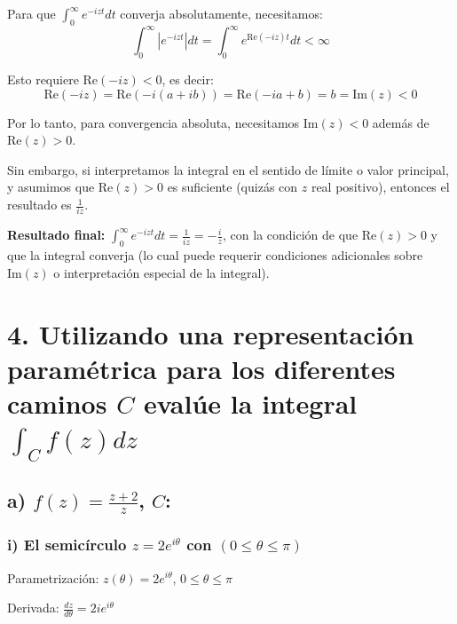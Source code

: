 \documentclass{article}
\begin{document}
Para que $\int_0^{\infty} e^{-izt} dt$ converja absolutamente, necesitamos:
$$\int_0^{\infty} |e^{-izt}| dt = \int_0^{\infty} e^{\text{Re}(-iz)t} dt < \infty$$

Esto requiere $\text{Re}(-iz) < 0$, es decir:
$$\text{Re}(-iz) = \text{Re}(-i(a + ib)) = \text{Re}(-ia + b) = b = \text{Im}(z) < 0$$

Por lo tanto, para convergencia absoluta, necesitamos $\text{Im}(z) < 0$ además de $\text{Re}(z) > 0$.

Sin embargo, si interpretamos la integral en el sentido de límite o valor principal, y asumimos que $\text{Re}(z) > 0$ es suficiente (quizás con $z$ real positivo), entonces el resultado es $\frac{1}{iz}$.

\textbf{Resultado final:} $\int_0^{\infty} e^{-izt} dt = \frac{1}{iz} = -\frac{i}{z}$, con la condición de que $\text{Re}(z) > 0$ y que la integral converja (lo cual puede requerir condiciones adicionales sobre $\text{Im}(z)$ o interpretación especial de la integral).

\newpage
\section*{4. Utilizando una representación paramétrica para los diferentes caminos $C$ evalúe la integral $\int_C f(z) dz$}

\subsection*{a) $f(z) = \frac{z + 2}{z}$, $C$:}

\subsubsection*{i) El semicírculo $z = 2e^{i\theta}$ con $(0 \leq \theta \leq \pi)$}

Parametrización: $z(\theta) = 2e^{i\theta}$, $0 \leq \theta \leq \pi$

Derivada: $\frac{dz}{d\theta} = 2ie^{i\theta}$
\end{document}
